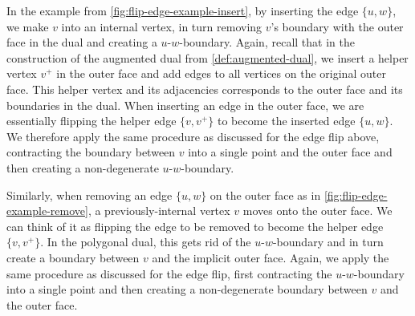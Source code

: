 In the example from \cref{fig:flip-edge-example-insert}, by inserting the edge $\{u,w\}$, we make $v$ into an internal vertex, in turn removing $v$'s boundary with the outer face in the dual and creating a $u$-$w$-boundary.
Again, recall that in the construction of the augmented dual from \cref{def:augmented-dual}, we insert a helper vertex $v^+$ in the outer face and add edges to all vertices on the original outer face.
This helper vertex and its adjacencies corresponds to the outer face and its boundaries in the dual.
When inserting an edge in the outer face, we are essentially flipping the helper edge $\{v,v^+\}$ to become the inserted edge $\{u,w\}$.
We therefore apply the same procedure as discussed for the edge flip above, contracting the boundary between $v$ into a single point and the outer face and then creating a non-degenerate $u$-$w$-boundary.

Similarly, when removing an edge $\{u,w\}$ on the outer face as in \cref{fig:flip-edge-example-remove}, a previously-internal vertex $v$ moves onto the outer face.
We can think of it as flipping the edge to be removed to become the helper edge $\{v,v^+\}$.
In the polygonal dual, this gets rid of the $u$-$w$-boundary and in turn create a boundary between $v$ and the implicit outer face.
Again, we apply the same procedure as discussed for the edge flip, first contracting the $u$-$w$-boundary into a single point and then creating a non-degenerate boundary between $v$ and the outer face.
